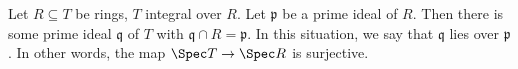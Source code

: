 Let $R \subseteq T$ be rings, $T$ integral over $R$. Let $\mathfrak{p}$ be a prime
ideal of $R$. Then there is some prime ideal $\mathfrak{q}$ of $T$ with
$\mathfrak{q} \cap R = \mathfrak{p}$. In this situation, we say that
$\mathfrak{q}$ lies over $\mathfrak{p}$. In other words, the map
$\Spec T\to \Spec R$ is surjective.
